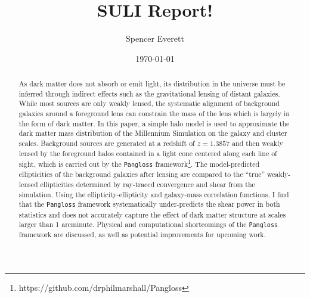 \documentclass[%
 reprint,
 amsmath,amssymb,
 aps,
]{revtex4-1}
\begin{document}

\title{SULI Report!}

\author{Spencer Everett}


\date{\today}

\begin{abstract}
As dark matter does not absorb or emit light, its distribution in the universe must be inferred through indirect effects such as the gravitational lensing of distant galaxies. While most sources are only weakly lensed, the systematic alignment of background galaxies around a foreground lens can constrain the mass of the lens which is largely in the form of dark matter. In this paper, a simple halo model is used to approximate the dark matter mass distribution of the Millennium Simulation on the galaxy and cluster scales. Background sources are generated at a redshift of ${z = 1.3857}$ and then weakly lensed by the foreground halos contained in a light cone centered along each line of sight, which is carried out by the \texttt{Pangloss} framework\footnote{https://github.com/drphilmarshall/Pangloss}. The model-predicted ellipticities of the background galaxies after lensing are compared to the ``true'' weakly-lensed ellipticities determined by ray-traced convergence and shear from the simulation. Using the ellipticity-ellipticity and galaxy-mass correlation functions, I find that the \texttt{Pangloss} framework systematically under-predicts the shear power in both statistics and does not accurately capture the effect of dark matter structure at scales larger than 1 arcminute. Physical and computational shortcomings of the \texttt{Pangloss} framework are discussed, as well as potential improvements for upcoming work.
\end{abstract}

\maketitle
\end{document}
